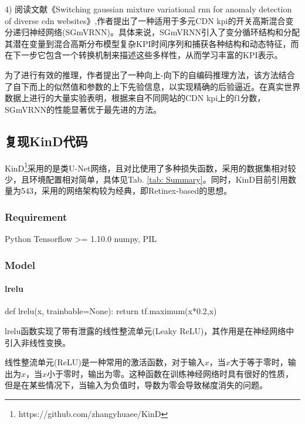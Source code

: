 \documentclass[letterpaper,12pt]{article}
\begin{document}
	4) 阅读文献《Switching gaussian mixture variational rnn for anomaly detection of diverse cdn websites》,作者提出了一种适用于多元CDN kpi的开关高斯混合变分递归神经网络(SGmVRNN)。具体来说，SGmVRNN引入了变分循环结构和分配其潜在变量到混合高斯分布模型复杂KPI时间序列和捕获各种结构和动态特征，而在下一步它包含一个转换机制来描述这些多样性，从而学习丰富的KPI表示。
	
	为了进行有效的推理，作者提出了一种向上-向下的自编码推理方法，该方法结合了自下而上的似然值和参数的上下先验信息，以实现精确的后验逼近。在真实世界数据上进行的大量实验表明，根据来自不同网站的CDN kpi上的f1分数，SGmVRNN的性能显著优于最先进的方法。
	
	
	
	\subsection{复现KinD代码}
	
	KinD\footnote{https://github.com/zhangyhuaee/KinD}采用的是类U-Net网络，且对比使用了多种损失函数，采用的数据集相对较少，且环境配置相对简单，具体见Tab. \ref{tab: Summary}。同时，KinD\cite{10.1145/3343031.3350926}目前引用数量为543，采用的网络架构较为经典，即Retinex-based的思想。
	
		\subsubsection{Requirement}
	
		\begin{python}
		Python
		Tensorflow >= 1.10.0
		numpy, PIL
		\end{python}
	
		\subsubsection{Model}
		
		\paragraph{lrelu}
		
		\begin{python}
			def lrelu(x, trainbable=None):
				return tf.maximum(x*0.2,x)
		\end{python}

		lrelu函数实现了带有泄露的线性整流单元(Leaky ReLU)，其作用是在神经网络中引入非线性变换。
		
		线性整流单元(ReLU)是一种常用的激活函数，对于输入$x$，当$x$大于等于零时，输出为$x$，当$x$小于零时，输出为零。这种函数在训练神经网络时具有很好的性质，但是在某些情况下，当输入为负值时，导数为零会导致梯度消失的问题。
		
\end{document}

